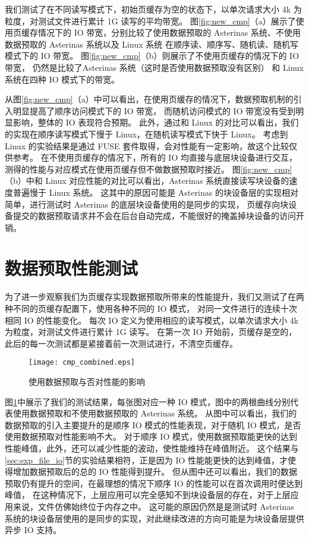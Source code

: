 我们测试了在不同读写模式下，初始页缓存为空的状态下，以单次请求大小 4k 为粒度，对测试文件进行累计 1G 读写的平均带宽。
图\ref{fig:new_cmp}（a）展示了使用页缓存情况下的 IO 带宽，分别比较了使用数据预取的 Asterinas 系统、不使用数据预取的 Asterinas 系统以及 Linux 系统
在顺序读、顺序写、随机读、随机写模式下的 IO 带宽。
图\ref{fig:new_cmp}（b）则展示了不使用页缓存的情况下的 IO 带宽， 仍然是比较了Asterinas 系统（这时是否使用数据预取没有区别）
和 Linux 系统在四种 IO 模式下的带宽。

从图\ref{fig:new_cmp}（a）中可以看出，在使用页缓存的情况下，数据预取机制的引入明显提高了顺序访问模式下的 IO 带宽，
而随机访问模式的 IO 带宽没有受到明显影响，整体的 IO 表现符合预期。
此外，通过和 Linux 的对比可以看出，我们的实现在顺序读写模式下慢于 Linux，在随机读写模式下快于 Linux。
考虑到 Linux 的实验结果是通过 FUSE 套件取得，会对性能有一定影响，故这个比较仅供参考。
在不使用页缓存的情况下，所有的 IO 均直接与底层块设备进行交互，测得的性能与对应模式在使用页缓存但不做数据预取时接近。
图\ref{fig:new_cmp}（b）中和 Linux 对应性能的对比可以看出，Asterinas 系统直接读写块设备的速度普遍慢于 Linux 系统。
这其中的原因可能是 Asterinas 的块设备层的实现相对简单，进行测试时 Asterinas 的底层块设备使用的是同步的实现，
页缓存向块设备提交的数据预取请求并不会在后台自动完成，不能很好的掩盖掉块设备的访问开销。


\section{数据预取性能测试}

为了进一步观察我们为页缓存实现数据预取所带来的性能提升，我们又测试了在两种不同的页缓存配置下，使用各种不同的 IO 模式，
对同一文件进行的连续十次相同 IO 的性能变化。
每次 IO 定义为使用相应的读写模式，以单次请求大小 4k 为粒度，对测试文件进行累计 1G 读写。
在第一次 IO 开始前，页缓存是空的，此后的每一次测试都是紧接着前一次测试进行，不清空页缓存。

\begin{figure}[h]
    \centering
    \texttt{[image: cmp\_combined.eps]}
    \caption{使用数据预取与否对性能的影响}
    \label{fig:cmp_ra}
\end{figure}

图\ref{fig:cmp_ra}中展示了我们的测试结果，每张图对应一种 IO 模式，图中的两根曲线分别代表使用数据预取和不使用数据预取的 Asterinas 系统。
从图中可以看出，我们的数据预取的引入主要提升的是顺序 IO 模式的性能表现，对于随机 IO 模式，是否使用数据预取对性能影响不大。
对于顺序 IO 模式，使用数据预取能更快的达到性能峰值，此外，还可以减少性能的波动，使性能维持在峰值附近。
这个结果与\ref{sec:exp_file_io}节的实验结果相符，正是因为 IO 性能能更快的达到峰值，才使得增加数据预取后的总的 IO 性能得到提升。
但从图中还可以看出，我们的数据预取仍有提升的空间，在最理想的情况下顺序 IO 的性能可以在首次调用时便达到峰值，
在这种情况下，上层应用可以完全感知不到块设备层的存在，对于上层应用来说，文件仿佛始终位于内存之中。
这可能的原因仍然是是测试时 Asterinas 系统的块设备层使用的是同步的实现，对此继续改进的方向可能是为块设备层提供异步 IO 支持。
